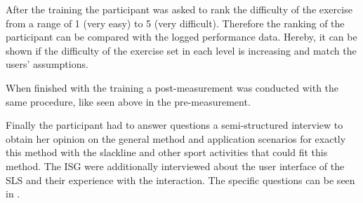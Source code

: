 After the training the participant was asked to rank the difficulty of the exercise from a range of 1 (very easy) to 5 (very difficult).
Therefore the ranking of the participant can be compared with the logged performance data.
Hereby, it can be shown if the difficulty of the exercise set in each level is increasing and match the users' assumptions. %


When finished with the training a post-measurement was conducted with the same procedure, like seen above in the pre-measurement.

Finally the participant had to answer questions a semi-structured interview to obtain her opinion on the general method and application scenarios for exactly this method with the slackline and other sport activities that could fit this method. The ISG were additionally interviewed about the user interface of the SLS and their experience with the interaction. The specific questions can be seen in .


